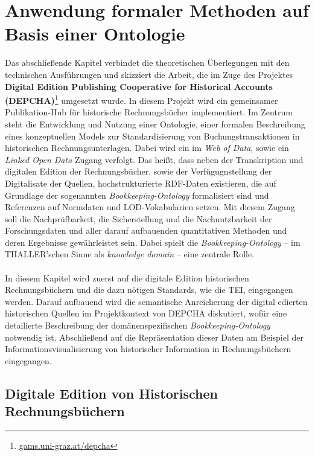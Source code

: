 \documentclass[12pt,a4paper]{article}
\begin{document}
\section{Anwendung formaler Methoden auf Basis einer Ontologie}
\label{Umsetzung}

Das abschließende Kapitel verbindet die theoretischen Überlegungen mit den technischen Ausführungen und skizziert die Arbeit, die im Zuge des Projektes \textbf{Digital Edition Publishing Cooperative for Historical Accounts (DEPCHA)}\footnote{\url{gams.uni-graz.at/depcha}} umgesetzt wurde. In diesem Projekt wird ein gemeinsamer Publikation-Hub für historische Rechnungsbücher implementiert. Im Zentrum steht die Entwicklung und Nutzung einer Ontologie, einer formalen Beschreibung eines konzeptuellen Models zur Standardisierung von Buchungstransaktionen in historischen Rechnungsunterlagen. Dabei wird ein im \textit{Web of Data}, sowie ein \textit{Linked Open Data} Zugang verfolgt. Das heißt, dass neben der Transkription und digitalen Edition der Rechnungsbücher, sowie der Verfügugnstellung der Digitalisate der Quellen, hochstrukturierte RDF-Daten existieren, die auf Grundlage der sogenannten \textit{Bookkeeping-Ontology} formalisiert sind und Referenzen auf Normdaten und LOD-Vokabularien setzen. Mit diesem Zugang soll die Nachprüfbarkeit, die Sicherstellung und die Nachnutzbarkeit der Forschungsdaten und aller darauf aufbauenden quantitativen Methoden und deren Ergebnisse gewährleistet sein. Dabei spielt die \textit{Bookkeeping-Ontology} -- im THALLER'schen Sinne als \textit{knowledge domain} -- eine zentrale Rolle.
\\
\\
In diesem Kapitel wird zuerst auf die digitale Edition historischen Rechnungsbüchern und die dazu nötigen Standards, wie die TEI, eingegangen werden. Darauf aufbauend wird die semantische Anreicherung der digital edierten historischen Quellen im Projektkontext von DEPCHA diskutiert, wofür eine detailierte Beschreibung der domänenspezifischen \textit{Bookkeeping-Ontology} notwendig ist. Abschließend auf die Repräsentation dieser Daten am Beispiel der Informationsvisualisierung von historischer Information in Rechnungsbüchern eingegangen.

\subsection{Digitale Edition von Historischen Rechnungsbüchern}
\end{document}

